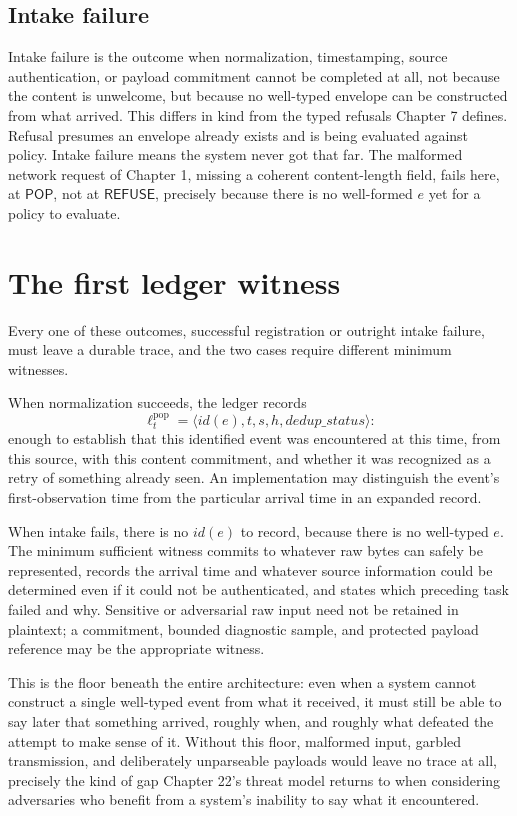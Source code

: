 \documentclass[11pt,openany]{book}
\newcommand{\Pop}{\mathsf{POP}}
\newcommand{\Refuse}{\mathsf{REFUSE}}
\begin{document}
\subsection{Intake failure}

Intake failure is the outcome when normalization, timestamping, source
authentication, or payload commitment cannot be completed at all, not because
the content is unwelcome, but because no well-typed envelope can be constructed
from what arrived. This differs in kind from the typed refusals Chapter 7
defines. Refusal presumes an envelope already exists and is being evaluated
against policy. Intake failure means the system never got that far. The
malformed network request of Chapter 1, missing a coherent content-length
field, fails here, at \(\Pop\), not at \(\Refuse\), precisely because there is
no well-formed \(e\) yet for a policy to evaluate.

\section{The first ledger witness}

Every one of these outcomes, successful registration or outright intake
failure, must leave a durable trace, and the two cases require different
minimum witnesses.

When normalization succeeds, the ledger records
\[
 \ell_t^{\mathrm{pop}}
 =\langle id(e),t,s,h,\mathit{dedup\_status}\rangle:
\]
enough to establish that this identified event was encountered at this time,
from this source, with this content commitment, and whether it was recognized
as a retry of something already seen. An implementation may distinguish the
event's first-observation time from the particular arrival time in an expanded
record.

When intake fails, there is no \(id(e)\) to record, because there is no
well-typed \(e\). The minimum sufficient witness commits to whatever raw bytes
can safely be represented, records the arrival time and whatever source
information could be determined even if it could not be authenticated, and
states which preceding task failed and why. Sensitive or adversarial raw input
need not be retained in plaintext; a commitment, bounded diagnostic sample,
and protected payload reference may be the appropriate witness.

This is the floor beneath the entire architecture: even when a system cannot
construct a single well-typed event from what it received, it must still be
able to say later that something arrived, roughly when, and roughly what
defeated the attempt to make sense of it. Without this floor, malformed input,
garbled transmission, and deliberately unparseable payloads would leave no
trace at all, precisely the kind of gap Chapter 22's threat model returns to
when considering adversaries who benefit from a system's inability to say what
it encountered.
\end{document}

